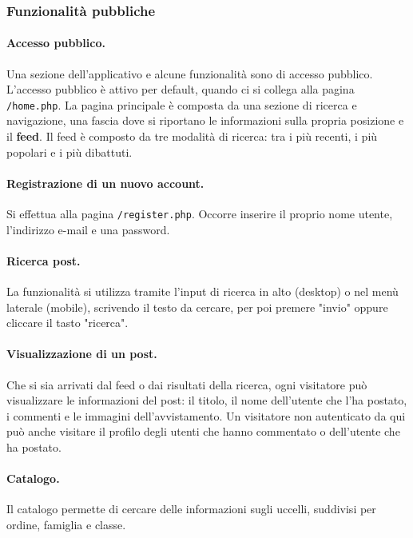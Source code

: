 \documentclass[12pt, a4paper]{article}
\begin{document}
    \subsubsection{Funzionalità pubbliche}

    \paragraph{Accesso pubblico.} Una sezione dell'applicativo e alcune funzionalità sono di accesso pubblico. L'accesso pubblico è attivo per default, quando ci si collega alla pagina \texttt{/home.php}. La pagina principale è composta da una sezione di ricerca e navigazione, una fascia dove si riportano le informazioni sulla propria posizione e il \textbf{feed}. Il feed è composto da tre modalità di ricerca: tra i più recenti, i più popolari e i più dibattuti.

    \paragraph{Registrazione di un nuovo account.} Si effettua alla pagina \texttt{/register.php}. Occorre inserire il proprio nome utente, l'indirizzo e-mail e una password.

    \paragraph{Ricerca post.} La funzionalità si utilizza tramite l'input di ricerca in alto (desktop) o nel menù laterale (mobile), scrivendo il testo da cercare, per poi premere "invio" oppure cliccare il tasto "ricerca".

    \paragraph{Visualizzazione di un post.} Che si sia arrivati dal feed o dai risultati della ricerca, ogni visitatore può visualizzare le informazioni del post: il titolo, il nome dell'utente che l'ha postato, i commenti e le immagini dell'avvistamento. Un visitatore non autenticato da qui può anche visitare il profilo degli utenti che hanno commentato o dell'utente che ha postato.

    \paragraph{Catalogo.} Il catalogo permette di cercare delle informazioni sugli uccelli, suddivisi per ordine, famiglia e classe.
\end{document}
